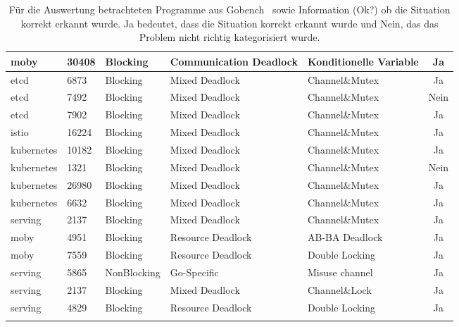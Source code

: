 \begin{longtable}[c]{|l|l|l|l|l|c|}
  moby             & 30408           & Blocking      & Communication Deadlock & Konditionelle Variable & Ja                                   \\ \hline
  etcd             & 6873            & Blocking      & Mixed Deadlock         & Channel\&Mutex         & Ja                                   \\ \hline
  etcd             & 7492            & Blocking      & Mixed Deadlock         & Channel\&Mutex         & Nein                                 \\ \hline
  etcd             & 7902            & Blocking      & Mixed Deadlock         & Channel\&Mutex         & Ja                                   \\ \hline
  istio            & 16224           & Blocking      & Mixed Deadlock         & Channel\&Mutex         & Ja                                   \\ \hline
  kubernetes       & 10182           & Blocking      & Mixed Deadlock         & Channel\&Mutex         & Ja                                   \\ \hline
  kubernetes       & 1321            & Blocking      & Mixed Deadlock         & Channel\&Mutex         & Nein                                 \\ \hline
  kubernetes       & 26980           & Blocking      & Mixed Deadlock         & Channel\&Mutex         & Ja                                   \\ \hline
  kubernetes       & 6632            & Blocking      & Mixed Deadlock         & Channel\&Mutex         & Ja                                   \\ \hline
  serving          & 2137            & Blocking      & Mixed Deadlock         & Channel\&Mutex         & Ja                                   \\ \hline
  moby             & 4951            & Blocking      & Resource Deadlock      & AB-BA Deadlock         & Ja                                   \\ \hline
  moby             & 7559            & Blocking      & Resource Deadlock      & Double Locking         & Ja                                   \\ \hline
  serving          & 5865            & NonBlocking   & Go-Specific            & Misuse channel         & Ja                                   \\ \hline
  serving          & 2137            & Blocking      & Mixed Deadlock         & Channel\&Lock          & Ja                                   \\ \hline
  serving          & 4829            & Blocking      & Resource Deadlock      & Double Locking         & Ja                                   \\ \hline
  \caption{Für die Auswertung betrachteten 
  Programme aus Gobench~\cite{gobench} sowie 
  Information (Ok?) ob die Situation korrekt erkannt wurde. Ja bedeutet, dass 
  die Situation korrekt erkannt wurde
  und Nein, das das Problem nicht richtig kategorisiert wurde.}
  \label{App-Goker}
  \end{longtable}